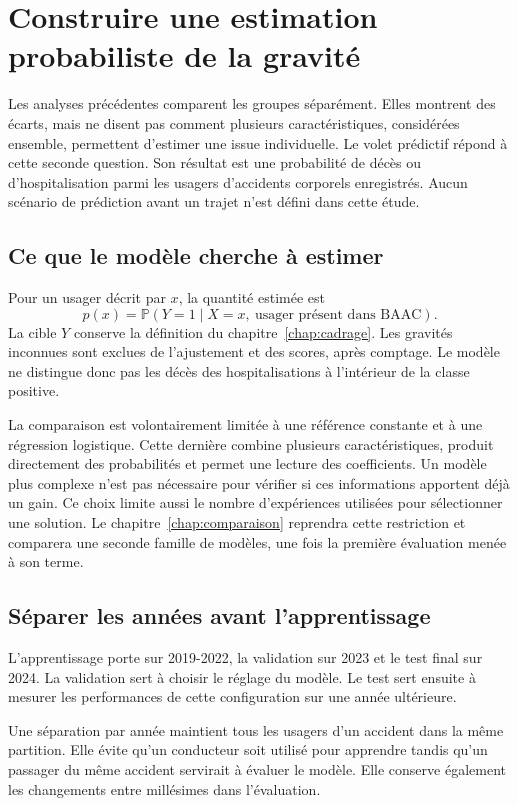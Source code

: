 \chapter{Construire une estimation probabiliste de la gravité}
\label{chap:protocole-ml}

Les analyses précédentes comparent les groupes séparément. Elles montrent des écarts,
mais ne disent pas comment plusieurs caractéristiques, considérées ensemble, permettent
d'estimer une issue individuelle. Le volet prédictif répond à cette seconde question.
Son résultat est une probabilité de décès ou d'hospitalisation parmi les usagers
d'accidents corporels enregistrés. Aucun scénario de prédiction avant un trajet n'est
défini dans cette étude.

\section{Ce que le modèle cherche à estimer}
Pour un usager décrit par $x$, la quantité estimée est
\[
  p(x)=\mathbb{P}(Y=1\mid X=x,\ \text{usager présent dans BAAC}).
\]
La cible $Y$ conserve la définition du chapitre~\ref{chap:cadrage}. Les gravités
inconnues sont exclues de l'ajustement et des scores, après comptage. Le modèle ne
distingue donc pas les décès des hospitalisations à l'intérieur de la classe positive.

La comparaison est volontairement limitée à une référence constante et à une
régression logistique. Cette dernière combine plusieurs caractéristiques, produit
directement des probabilités et permet une lecture des coefficients. Un modèle plus
complexe n'est pas nécessaire pour vérifier si ces informations apportent déjà un gain.
Ce choix limite aussi le nombre d'expériences utilisées pour sélectionner une solution.
Le chapitre~\ref{chap:comparaison} reprendra cette restriction et comparera une seconde
famille de modèles, une fois la première évaluation menée à son terme.

\section{Séparer les années avant l'apprentissage}
L'apprentissage porte sur 2019-2022, la validation sur 2023 et le test final sur 2024.
La validation sert à choisir le réglage du modèle. Le test sert ensuite à mesurer les
performances de cette configuration sur une année ultérieure.


Une séparation par année maintient tous les usagers d'un accident dans la même
partition. Elle évite qu'un conducteur soit utilisé pour apprendre tandis qu'un
passager du même accident servirait à évaluer le modèle. Elle conserve également les
changements entre millésimes dans l'évaluation.

